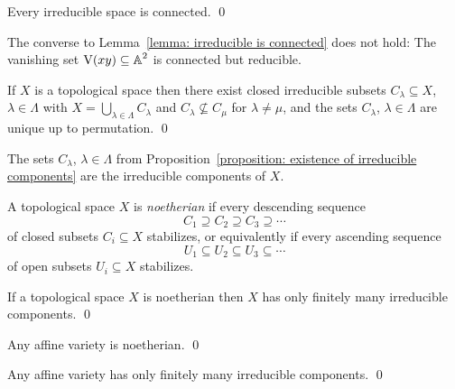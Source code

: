 \begin{lemma}
  \label{lemma: irreducible is connected}
  Every irreducible space is connected.
  \qed
\end{lemma}


\begin{example}
  The converse to Lemma~\ref{lemma: irreducible is connected} does not hold:
  The vanishing set $\operatorname{V}(xy) \subseteq \operatorname{\mathbb{A}}^2$ is connected but reducible.
\end{example}


\begin{proposition}
  \label{proposition: existence of irreducible components}
  If $X$ is a topological space then there exist closed irreducible subsets $C_\lambda \subseteq X$, $\lambda \in \Lambda$ with $X = \bigcup_{\lambda \in \Lambda} C_\lambda$ and $C_\lambda \nsubseteq C_\mu$ for $\lambda \neq \mu$, and the sets $C_\lambda$, $\lambda \in \Lambda$ are unique up to permutation.
  \qed
\end{proposition}


\begin{definition}
  The sets $C_\lambda$, $\lambda \in \Lambda$ from Proposition~\ref{proposition: existence of irreducible components} are the irreducible components of $X$.
\end{definition}


\begin{definition}
  A topological space $X$ is \emph{noetherian} if every descending sequence
  \[
              C_1
    \supseteq C_2
    \supseteq C_3
    \supseteq \dotsb
  \]
  of closed subsets $C_i \subseteq X$ stabilizes, or equivalently if every ascending sequence
  \[
              U_1
    \subseteq U_2
    \subseteq U_3
    \subseteq \dotsb
  \]
  of open subsets $U_i \subseteq X$ stabilizes.
\end{definition}


\begin{lemma}
  If a topological space $X$ is noetherian then $X$ has only finitely many irreducible components.
  \qed
\end{lemma}


\begin{lemma}
  Any affine variety is noetherian.
  \qed
\end{lemma}


\begin{corollary}
  Any affine variety has only finitely many irreducible components.
  \qed
\end{corollary}


